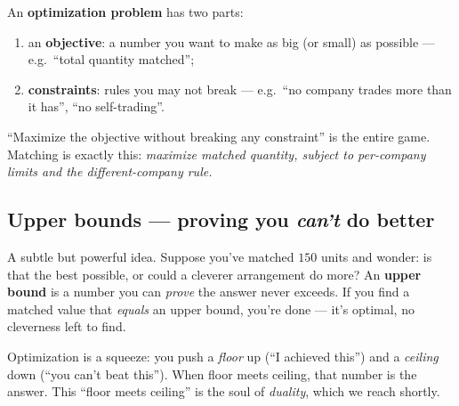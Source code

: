 An \textbf{optimization problem} has two parts:
\begin{enumerate}[leftmargin=1.6em,nosep]
  \item an \textbf{objective}: a number you want to make as big (or small) as
        possible --- e.g.\ ``total quantity matched'';
  \item \textbf{constraints}: rules you may not break --- e.g.\ ``no company
        trades more than it has'', ``no self-trading''.
\end{enumerate}
``Maximize the objective without breaking any constraint'' is the entire game.
Matching is exactly this: \emph{maximize matched quantity, subject to per-company
limits and the different-company rule.}

\subsection{Upper bounds --- proving you \emph{can't} do better}

A subtle but powerful idea. Suppose you've matched $150$ units and wonder: is that
the best possible, or could a cleverer arrangement do more? An \textbf{upper bound}
is a number you can \emph{prove} the answer never exceeds. If you find a matched
value that \emph{equals} an upper bound, you're done --- it's optimal, no cleverness
left to find.

\begin{center}
\end{center}

\begin{intu}
Optimization is a squeeze: you push a \emph{floor} up (``I achieved this'') and a
\emph{ceiling} down (``you can't beat this''). When floor meets ceiling, that
number is the answer. This ``floor meets ceiling'' is the soul of \emph{duality},
which we reach shortly.
\end{intu}

